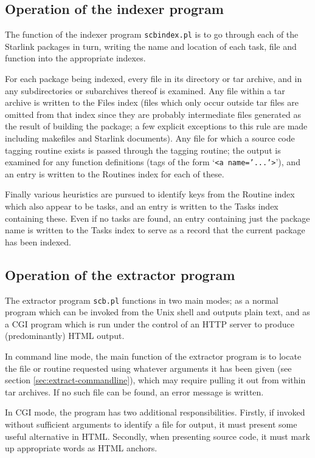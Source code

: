 \documentclass[twoside,11pt]{article}
\newcommand{\xlabel}[1]{}
\renewcommand{\_}{\texttt{\symbol{95}}}
\begin{document}
\subsection{Operation of the indexer program}

The function of the indexer program {\tt scbindex.pl} 
is to go through
each of the Starlink packages in turn, writing the name and 
location of each task, file and function into the appropriate 
indexes.

For each package being indexed, every file in 
its directory or tar archive, 
and in any subdirectories or subarchives thereof is examined. 
Any file within a tar archive 
is written to the Files index
(files which only occur outside tar files are omitted
from that index since they are probably intermediate files 
generated as the result of building the package; 
a few explicit exceptions to this rule are made 
including makefiles and Starlink documents). 
Any file for which a
source code tagging routine exists
is passed through the tagging routine;
the output is examined for any function definitions 
(tags of the form `{\tt <a name='...'>}'), 
and an entry is written to the Routines index for each of these.

Finally various heuristics are pursued to identify
keys from the Routine index which also appear to be tasks, 
and an entry is written to the Tasks index containing these.
Even if no tasks are found, an entry containing just the package
name is written to the Tasks index to serve as a record that 
the current package has been indexed.


\subsection{\xlabel{sec:internals-extractor}Operation of the extractor program}

The extractor program {\tt scb.pl} functions in two main modes;
as a normal program which can be invoked from the Unix shell and
outputs plain text,
and as a CGI program which is run under the control of an HTTP server
to produce (predominantly) HTML output.

In command line mode, the main function of the extractor
program is to locate 
the file or routine requested using whatever arguments it
has been given (see section \ref{sec:extract-commandline}),
which may require pulling it out from within tar archives.
If no such file can be found, an error message is written.

In CGI mode, the program has two additional responsibilities.
Firstly, if invoked without sufficient arguments to identify 
a file for output, it must present some useful alternative in HTML.
Secondly, when presenting source code, it must mark up 
appropriate words as HTML anchors.
\end{document}
